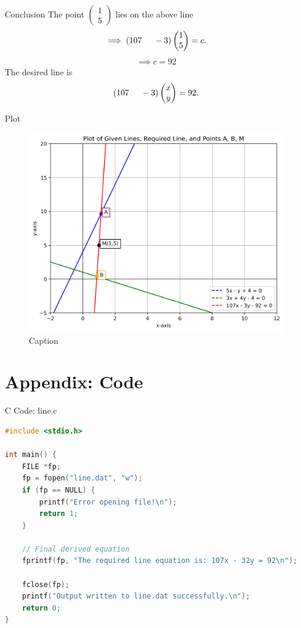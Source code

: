 \documentclass{beamer}
\numberwithin{equation}{section}
\providecommand{\brak}[1]{\ensuremath{\left(#1\right)}}
\theoremstyle{remark}
\newcommand{\myvec}[1]{\ensuremath{\begin{pmatrix}#1\end{pmatrix}}}
\begin{document}
 \begin{frame}{Conclusion}
 The point $\myvec{1\\5}$ lies on the above line
\begin{align}
 \implies \brak{107\hspace{0.5cm}-3}\myvec{1\\5}=c.
 \end{align}
     \begin{align}
 \implies c=92
\end{align}
The desired line is 
\begin{align}
    \brak{107\hspace{0.5cm}-3}\myvec{x\\y}=92.
   \end{align} 
\end{frame}

\begin{frame}{Plot}
\begin{figure}
    \centering
    \includegraphics[width=0.8\linewidth]{figs/01.png}
    \caption{Caption}
    \label{fig:placeholder}
\end{figure}    
\end{frame}

\section*{Appendix: Code}

\begin{frame}[fragile]{C Code: line.c}
\begin{lstlisting}[language=C]
#include <stdio.h>

int main() {
    FILE *fp;
    fp = fopen("line.dat", "w");
    if (fp == NULL) {
        printf("Error opening file!\n");
        return 1;
    }

    // Final derived equation
    fprintf(fp, "The required line equation is: 107x - 32y = 92\n");

    fclose(fp);
    printf("Output written to line.dat successfully.\n");
    return 0;
}
        \end{lstlisting}
\end{frame}
\end{document}
